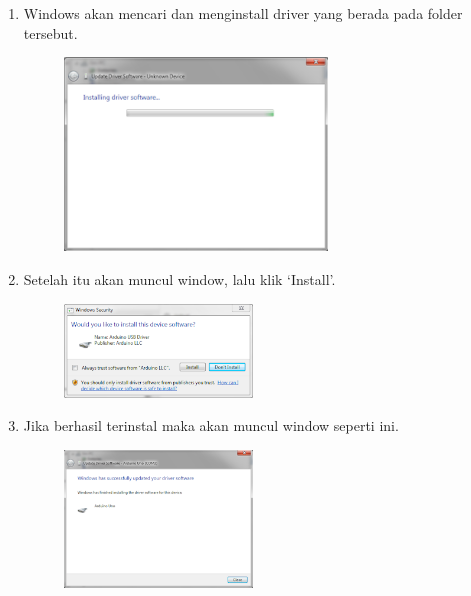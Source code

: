 \begin{enumerate}
\begin{figure}[H]
		\centering
	\end{figure}
\item Windows akan mencari dan menginstall driver yang berada pada folder tersebut.
	\begin{figure}[H]
		\includegraphics[width=7cm]{figures/5/1154121/Teori/8.png}
		\centering
	\end{figure}
\item Setelah itu akan muncul window, lalu klik `Install'.
	\begin{figure}[H]
		\includegraphics[width=5cm]{figures/5/1154121/Teori/9.png}
		\centering
	\end{figure}
\item Jika berhasil terinstal maka akan muncul window seperti ini.
	\begin{figure}[H]
		\includegraphics[width=5cm]{figures/5/1154121/Teori/10.png}
		\centering
	\end{figure}
\end{enumerate}

